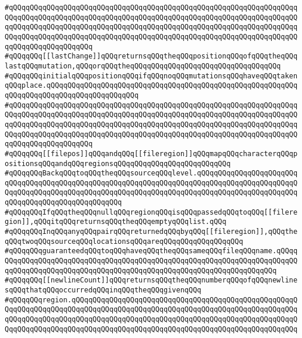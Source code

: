 \verb|#qQQqqQQqqQQqqQQqqQQqqQQqqQQqqQQqqQQqqQQqqQQqqQQqqQQqqQQqqQQqqQQqqQQqqQQqqQQqqQQqqQQqqQQqqQQqqQQqqQQqqQQqqQQqqQQqqQQqqQQqqQQqqQQqqQQqqQQqqQQqqQQqqQQqqQQqqQQqqQQqqQQqqQQqqQQqqQQqqQQqqQQqqQQqqQQqqQQqqQQqqQQqqQQqqQQqqQQqqQQqqQQqqQQqqQQqqQQqqQQqqQQqqQQqqQQqqQQqqQQqqQQqqQQqqQQqqQQqqQQqqQQqqQQqqQQqqQQqqQQq|\newline
\verb|#qQQqqQQq[[lastChange]]qQQqreturnsqQQqtheqQQqpositionqQQqofqQQqtheqQQqlastqQQqmutation,qQQqorqQQqtheqQQqqQQqqQQqqQQqqQQqqQQqqQQqqQQqqQQq|\newline
\verb|#qQQqqQQqinitialqQQqpositionqQQqifqQQqnoqQQqmutationsqQQqhaveqQQqtakenqQQqplace.qQQqqQQqqQQqqQQqqQQqqQQqqQQqqQQqqQQqqQQqqQQqqQQqqQQqqQQqqQQqqQQqqQQqqQQqqQQqqQQqqQQqqQQqqQQq|\newline
\verb|#qQQqqQQqqQQqqQQqqQQqqQQqqQQqqQQqqQQqqQQqqQQqqQQqqQQqqQQqqQQqqQQqqQQqqQQqqQQqqQQqqQQqqQQqqQQqqQQqqQQqqQQqqQQqqQQqqQQqqQQqqQQqqQQqqQQqqQQqqQQqqQQqqQQqqQQqqQQqqQQqqQQqqQQqqQQqqQQqqQQqqQQqqQQqqQQqqQQqqQQqqQQqqQQqqQQqqQQqqQQqqQQqqQQqqQQqqQQqqQQqqQQqqQQqqQQqqQQqqQQqqQQqqQQqqQQqqQQqqQQqqQQqqQQqqQQqqQQqqQQq|\newline
\verb|#qQQqqQQq[[filepos]]qQQqandqQQq[[fileregion]]qQQqmapqQQqcharacterqQQqpositionsqQQqandqQQqregionsqQQqqQQqqQQqqQQqqQQqqQQqqQQq|\newline
\verb|#qQQqqQQqBackqQQqtoqQQqtheqQQqsourceqQQqlevel.qQQqqQQqqQQqqQQqqQQqqQQqqQQqqQQqqQQqqQQqqQQqqQQqqQQqqQQqqQQqqQQqqQQqqQQqqQQqqQQqqQQqqQQqqQQqqQQqqQQqqQQqqQQqqQQqqQQqqQQqqQQqqQQqqQQqqQQqqQQqqQQqqQQqqQQqqQQqqQQqqQQqqQQqqQQqqQQqqQQqqQQqqQQqqQQq|\newline
\verb|#qQQqqQQqIfqQQqtheqQQqnullqQQqregionqQQqisqQQqpassedqQQqtoqQQq[[fileregion]],qQQqitqQQqreturnsqQQqtheqQQqemptyqQQqlist.qQQq|\newline
\verb|#qQQqqQQqInqQQqanyqQQqpairqQQqreturnedqQQqbyqQQq[[fileregion]],qQQqtheqQQqtwoqQQqsourceqQQqlocationsqQQqareqQQqqQQqqQQqqQQqqQQq|\newline
\verb|#qQQqqQQqguaranteedqQQqtoqQQqhaveqQQqtheqQQqsameqQQqfileqQQqname.qQQqqQQqqQQqqQQqqQQqqQQqqQQqqQQqqQQqqQQqqQQqqQQqqQQqqQQqqQQqqQQqqQQqqQQqqQQqqQQqqQQqqQQqqQQqqQQqqQQqqQQqqQQqqQQqqQQqqQQqqQQqqQQqqQQqqQQqqQQq|\newline
\verb|#qQQqqQQq[[newlineCount]]qQQqreturnsqQQqtheqQQqnumberqQQqofqQQqnewlinesqQQqthatqQQqoccurredqQQqinqQQqtheqQQqgivenqQQq|\newline
\verb|#qQQqqQQqregion.qQQqqQQqqQQqqQQqqQQqqQQqqQQqqQQqqQQqqQQqqQQqqQQqqQQqqQQqqQQqqQQqqQQqqQQqqQQqqQQqqQQqqQQqqQQqqQQqqQQqqQQqqQQqqQQqqQQqqQQqqQQqqQQqqQQqqQQqqQQqqQQqqQQqqQQqqQQqqQQqqQQqqQQqqQQqqQQqqQQqqQQqqQQqqQQqqQQqqQQqqQQqqQQqqQQqqQQqqQQqqQQqqQQqqQQqqQQqqQQqqQQqqQQqqQQqqQQqqQQqqQQq|\newline
